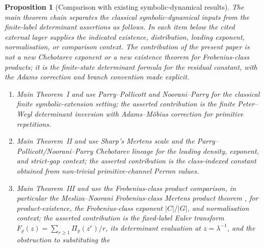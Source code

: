 \documentclass[11pt,a4paper]{amsart}
\theoremstyle{plain}
\newtheorem{proposition}[theorem]{Proposition}
\theoremstyle{definition}
\theoremstyle{remark}
\begin{document}
\begin{proposition}[Comparison with existing symbolic-dynamical results]
  \label{prop:theorem-by-theorem-comparison-calibration}
  \label{rem:main-theorem-literature-comparison}
  \label{rem:theorem-by-theorem-comparison-calibration}
  \label{rem:main-theorem-comparison-context}
  The main theorem chain separates the classical symbolic-dynamical inputs
  from the finite-label determinant assertions as follows.  In each item below
  the cited external layer supplies the indicated existence, distribution,
  leading exponent, normalisation, or comparison context.  The contribution of
  the present paper is not a new Chebotarev exponent or a new existence theorem
  for Frobenius-class products; it is the finite-state determinant formula for
  the residual constant, with the Adams correction and branch convention made
  explicit.
  \begin{enumerate}[label=\textup{(\roman*)},leftmargin=*]
    \item Main Theorem~I and
    use Parry--Pollicott \cite{ParryPollicott1986Chebotarev} and
    Noorani--Parry \cite{NooraniParry1992ChebotarevShifts} for the classical
    finite symbolic-extension setting; the asserted contribution is
    the finite
    Peter--Weyl determinant inversion with Adams--M\"obius correction for
    primitive repetitions.
    \item Main Theorem~II and
    use Sharp's Mertens scale \cite{Sharp1991Mertens} and the
    Parry--Pollicott/Noorani--Parry Chebotarev lineage for the leading density,
    exponent, and strict-gap context; the asserted contribution is the
    class-indexed constant obtained from non-trivial primitive-channel Perron
    values.
    \item Main Theorem~III and
    use the Frobenius-class product comparison, in particular the
    Mesliza--Noorani Frobenius-class Mertens product theorem
    \cite{MeslizaNoorani1999FrobeniusMertens}, for product-existence, the
    Frobenius-class exponent \(|C|/|G|\), and normalisation context; the
    asserted contribution is the fixed-label Euler transform
    \(F_\varrho(z)=\sum_{r\ge1}\Pi_\varrho(z^r)/r\), its determinant
    evaluation at \(z=\lambda^{-1}\), and the obstruction to substituting the

\end{enumerate}
\end{proposition}
\end{document}
